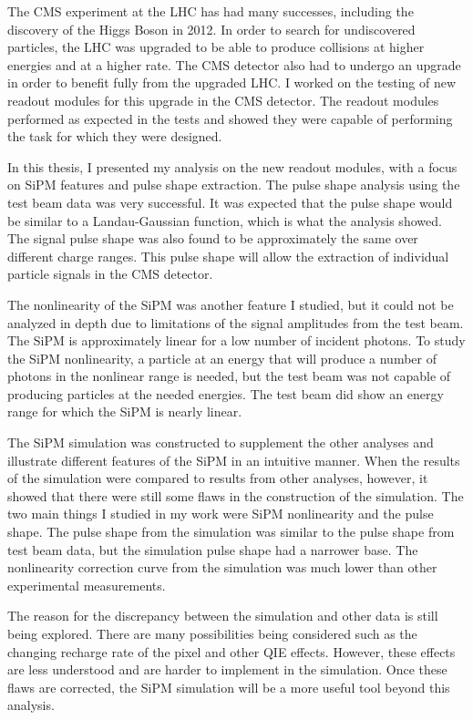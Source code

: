The CMS experiment at the LHC has had many successes, including the discovery of the Higgs Boson in 2012. In order to search for undiscovered particles, the LHC was upgraded to be able to produce collisions at higher energies and at a higher rate. The CMS detector also had to undergo an upgrade in order to benefit fully from the upgraded LHC. I worked on the testing of new readout modules for this upgrade in the CMS detector. The readout modules performed as expected in the tests and showed they were capable of performing the task for which they were designed. 

In this thesis, I presented my analysis on the new readout modules, with a focus on SiPM features and pulse shape extraction. The pulse shape analysis using the test beam data was very successful. It was expected that the pulse shape would be similar to a Landau-Gaussian function, which is what the analysis showed. The signal pulse shape was also found to be approximately the same over different charge ranges. This pulse shape will allow the extraction of individual particle signals in the CMS detector. 

The nonlinearity of the SiPM was another feature I studied, but it could not be analyzed in depth due to limitations of the signal amplitudes from the test beam. The SiPM is approximately linear for a low number of incident photons. To study the SiPM nonlinearity, a particle at an energy that will produce a number of photons in the nonlinear range is needed, but the test beam was not capable of producing particles at the needed energies. The test beam did show an energy range for which the SiPM is nearly linear.

The SiPM simulation was constructed to supplement the other analyses and illustrate different features of the SiPM in an intuitive manner. When the results of the simulation were compared to results from other analyses, however, it showed that there were still some flaws in the construction of the simulation. The two main things I studied in my work were SiPM nonlinearity and the pulse shape. The pulse shape from the simulation was similar to the pulse shape from test beam data, but the simulation pulse shape had a narrower base. The nonlinearity correction curve from the simulation was much lower than other experimental measurements.

The reason for the discrepancy between the simulation and other data is still being explored. There are many possibilities being considered such as the changing recharge rate of the pixel and other QIE effects. However, these effects are less understood and are harder to implement in the simulation. Once these flaws are corrected, the SiPM simulation will be a more useful tool beyond this analysis. 

